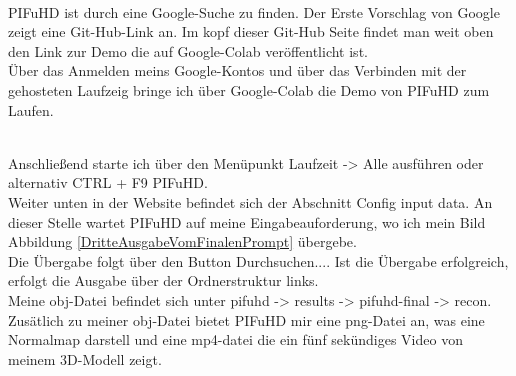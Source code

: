 \\
PIFuHD ist durch eine Google-Suche zu finden. Der Erste Vorschlag von Google zeigt eine Git-Hub-Link an. Im kopf dieser Git-Hub Seite findet man weit oben den Link zur Demo die auf Google-Colab veröffentlicht ist.
\\
Über das Anmelden meins Google-Kontos und über das Verbinden mit der gehosteten Laufzeig bringe ich über Google-Colab die Demo von PIFuHD zum Laufen.

\\
Anschließend starte ich über den Menüpunkt Laufzeit -> Alle ausführen oder alternativ CTRL + F9 PIFuHD.
\\
Weiter unten in der Website befindet sich der Abschnitt Config input data. An dieser Stelle wartet PIFuHD auf meine Eingabeauforderung, wo ich mein Bild Abbildung \ref{DritteAusgabeVomFinalenPrompt} übergebe.
\\
Die Übergabe folgt über den Button Durchsuchen.... Ist die Übergabe erfolgreich, erfolgt die Ausgabe über der Ordnerstruktur links.
\\
Meine obj-Datei befindet sich unter pifuhd -> results -> pifuhd-final -> recon. Zusätlich zu meiner obj-Datei bietet PIFuHD mir eine png-Datei an, was eine Normalmap darstell und eine mp4-datei die ein fünf sekündiges Video von meinem 3D-Modell zeigt.
\\

